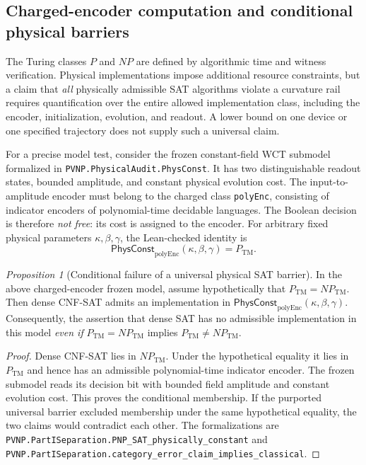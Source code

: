 \documentclass[12pt]{article}
\theoremstyle{remark}
\newtheorem{proposition}[theorem]{Proposition}
\begin{document}
\subsection{Charged-encoder computation and conditional physical barriers}
\label{sec:category-physical-barriers}

The Turing classes $P$ and $NP$ are defined by algorithmic time and
witness verification. Physical implementations impose additional
resource constraints, but a claim that \emph{all} physically admissible
SAT algorithms violate a curvature rail requires quantification over
the entire allowed implementation class, including the encoder,
initialization, evolution, and readout. A lower bound on one device
or one specified trajectory does not supply such a universal claim.

For a precise model test, consider the frozen constant-field WCT
submodel formalized in
\nolinkurl{PVNP.PhysicalAudit.PhysConst}. It has two distinguishable
readout states, bounded amplitude, and constant physical evolution
cost. The input-to-amplitude encoder must belong to the charged
class \texttt{polyEnc}, consisting of indicator encoders of
polynomial-time decidable languages. The Boolean decision is
therefore \emph{not free}: its cost is assigned to the encoder.
For arbitrary fixed physical parameters $\kappa,\beta,\gamma$, the
Lean-checked identity is
\[
 \mathsf{PhysConst}_{\mathrm{polyEnc}}
 (\kappa,\beta,\gamma)=P_{\mathrm{TM}}.
\]

\begin{proposition}[Conditional failure of a universal physical SAT barrier]
\label{prop:charged-encoder-barrier}
In the above charged-encoder frozen model, assume hypothetically that
$P_{\mathrm{TM}}=NP_{\mathrm{TM}}$. Then dense CNF-SAT admits an
implementation in
$\mathsf{PhysConst}_{\mathrm{polyEnc}}(\kappa,\beta,\gamma)$.
Consequently, the assertion that dense SAT has no admissible
implementation in this model \emph{even if}
$P_{\mathrm{TM}}=NP_{\mathrm{TM}}$ implies
$P_{\mathrm{TM}}\ne NP_{\mathrm{TM}}$.
\end{proposition}

\begin{proof}
Dense CNF-SAT lies in $NP_{\mathrm{TM}}$. Under the hypothetical
equality it lies in $P_{\mathrm{TM}}$ and hence has an admissible
polynomial-time indicator encoder. The frozen submodel reads its
decision bit with bounded field amplitude and constant evolution
cost. This proves the conditional membership. If the purported
universal barrier excluded membership under the same hypothetical
equality, the two claims would contradict each other. The
formalizations are
\nolinkurl{PVNP.PartISeparation.PNP_SAT_physically_constant}
and
\nolinkurl{PVNP.PartISeparation.category_error_claim_implies_classical}.
\end{proof}
\end{document}
